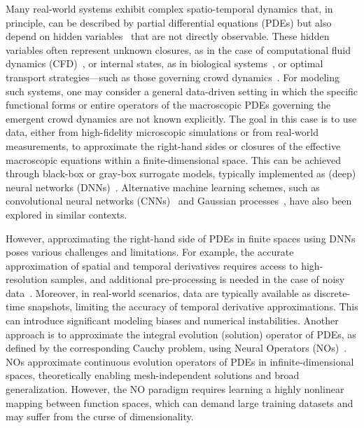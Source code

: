 \documentclass{article}
\begin{document}
Many real-world systems exhibit complex spatio-temporal dynamics that, in principle, can be described by partial differential equations (PDEs) but also depend on hidden variables~\cite{kemeth2018emergent,reinbold2019data,kemeth2022learning,sroczynski2024learning} that are not directly observable. These hidden variables often represent unknown closures, as in the case of computational fluid dynamics (CFD)~\cite{russo2007reduced,kutz2017deep,raissi2020hidden,joglekar2023machine,evangelou2022parameter,Kevrekidis_DM}, or internal states, as in biological systems~\cite{engelhardt2017bayesian,yazdani2020systems,lee2023learning,ahmadi2024ai}, or optimal transport strategies—such as those governing crowd dynamics~\cite{bellomo2011modeling,bellomo2012modeling,cristiani2014multiscale,cristiani2014overview,bellomo2022towards,bellomo2023human}. For modeling such systems, one may consider a general data-driven setting in which the specific functional forms or entire operators of the macroscopic PDEs governing the emergent crowd dynamics are not known explicitly. The goal in this case is to use data, either from high-fidelity microscopic simulations or from real-world measurements, to approximate the right-hand sides or closures of the effective macroscopic equations within a finite-dimensional space. This can be achieved through black-box or gray-box surrogate models, typically implemented as (deep) neural networks (DNNs)~\cite{Lee2020,Galaris2022,lee2023learning,fabiani2024task,de2024ai}. Alternative machine learning schemes, such as convolutional neural networks (CNNs)~\cite{qu2022learning,vlachas2022multiscale} and Gaussian processes~\cite{pang2020physics,chen2021solving}, have also been explored in similar contexts. 

However, approximating the right-hand side of PDEs in finite spaces using DNNs poses various challenges and limitations. For example, the accurate approximation of spatial and temporal derivatives requires access to high-resolution samples, and additional pre-processing is needed in the case of noisy data~\cite{Lee2020,lee2023learning}. Moreover, in real-world scenarios, data are typically available as discrete-time snapshots, limiting the accuracy of temporal derivative approximations. This can introduce significant modeling biases and numerical instabilities.  
Another approach is to approximate the integral evolution (solution) operator of PDEs, as defined by the corresponding Cauchy problem, using Neural Operators (NOs)~\cite{li2023deep,goswami2023physics,li2020fourier,peyvan2024riemannonets,zappala2024learning,fabiani2025randonets}. NOs approximate continuous evolution operators of PDEs in infinite-dimensional spaces, theoretically enabling mesh-independent solutions and broad generalization. However, the NO paradigm requires learning a highly nonlinear mapping between function spaces, which can demand large training datasets and may suffer from the curse of dimensionality. 
\end{document}
